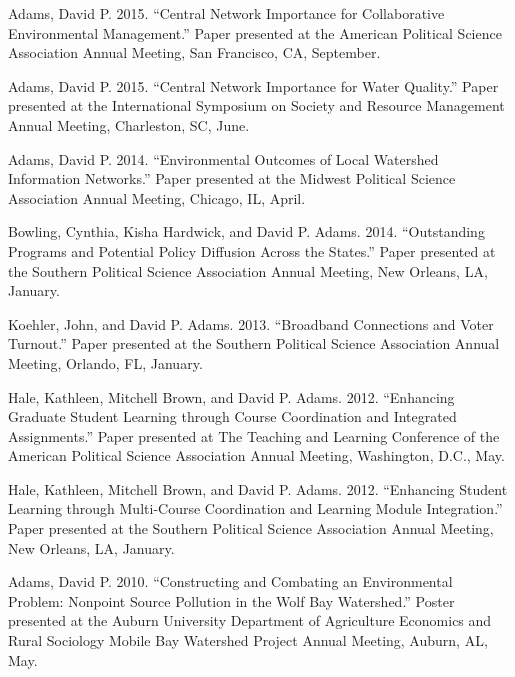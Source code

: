 \documentclass[12pt,letterpaper]{article}
\renewenvironment{itemize}{
  \begin{list}{}{
    \setlength{\leftmargin}{1.5em}
    \setlength{\itemsep}{0.25em}
    \setlength{\parskip}{0pt}
    \setlength{\parsep}{0.25em}
  }
}{
  \end{list}
}
\begin{document}
\begin{itemize}
      \item Adams, David P. 2015. ``Central Network Importance for Collaborative Environmental Management.'' Paper presented at the American Political Science Association Annual Meeting, San Francisco, CA, September.
      
      \item Adams, David P. 2015. ``Central Network Importance for Water Quality.'' Paper presented at the International Symposium on Society and Resource Management Annual Meeting, Charleston, SC, June.
      
      \item Adams, David P. 2014. ``Environmental Outcomes of Local Watershed Information Networks.'' Paper presented at the Midwest Political Science Association Annual Meeting, Chicago, IL, April.
      
      \item Bowling, Cynthia, Kisha Hardwick, and David P. Adams. 2014. ``Outstanding Programs and Potential Policy Diffusion Across the States.'' Paper presented at the Southern Political Science Association Annual Meeting, New Orleans, LA, January.
      
      \item Koehler, John, and David P. Adams. 2013. ``Broadband Connections and Voter Turnout.'' Paper presented at the Southern Political Science Association Annual Meeting, Orlando, FL, January.
      
      \item Hale, Kathleen, Mitchell Brown, and David P. Adams. 2012. ``Enhancing Graduate Student Learning through Course Coordination and Integrated Assignments.'' Paper presented at The Teaching and Learning Conference of the American Political Science Association Annual Meeting, Washington, D.C., May.
      
      \item Hale, Kathleen, Mitchell Brown, and David P. Adams. 2012. ``Enhancing Student Learning through Multi-Course Coordination and Learning Module Integration.'' Paper presented at the Southern Political Science Association Annual Meeting, New Orleans, LA, January.
      
      \item Adams, David P. 2010. ``Constructing and Combating an Environmental Problem: Nonpoint Source Pollution in the Wolf Bay Watershed.'' Poster presented at the Auburn University Department of Agriculture Economics and Rural Sociology Mobile Bay Watershed Project Annual Meeting, Auburn, AL, May.
  \end{itemize}
  
\end{document}
